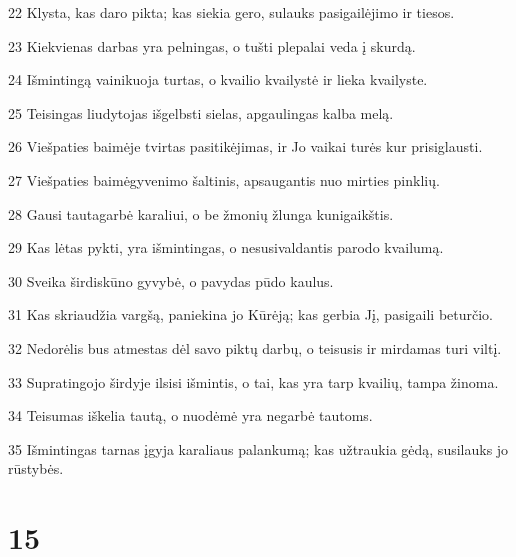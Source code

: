 \par 22 Klysta, kas daro pikta; kas siekia gero, sulauks pasigailėjimo ir tiesos. 
\par 23 Kiekvienas darbas yra pelningas, o tušti plepalai veda į skurdą. 
\par 24 Išmintingą vainikuoja turtas, o kvailio kvailystė ir lieka kvailyste. 
\par 25 Teisingas liudytojas išgelbsti sielas, apgaulingas kalba melą. 
\par 26 Viešpaties baimėje tvirtas pasitikėjimas, ir Jo vaikai turės kur prisiglausti. 
\par 27 Viešpaties baimė­gyvenimo šaltinis, apsaugantis nuo mirties pinklių. 
\par 28 Gausi tauta­garbė karaliui, o be žmonių žlunga kunigaikštis. 
\par 29 Kas lėtas pykti, yra išmintingas, o nesusivaldantis parodo kvailumą. 
\par 30 Sveika širdis­kūno gyvybė, o pavydas pūdo kaulus. 
\par 31 Kas skriaudžia vargšą, paniekina jo Kūrėją; kas gerbia Jį, pasigaili beturčio. 
\par 32 Nedorėlis bus atmestas dėl savo piktų darbų, o teisusis ir mirdamas turi viltį. 
\par 33 Supratingojo širdyje ilsisi išmintis, o tai, kas yra tarp kvailių, tampa žinoma. 
\par 34 Teisumas iškelia tautą, o nuodėmė yra negarbė tautoms. 
\par 35 Išmintingas tarnas įgyja karaliaus palankumą; kas užtraukia gėdą, susilauks jo rūstybės.



\chapter{15}


